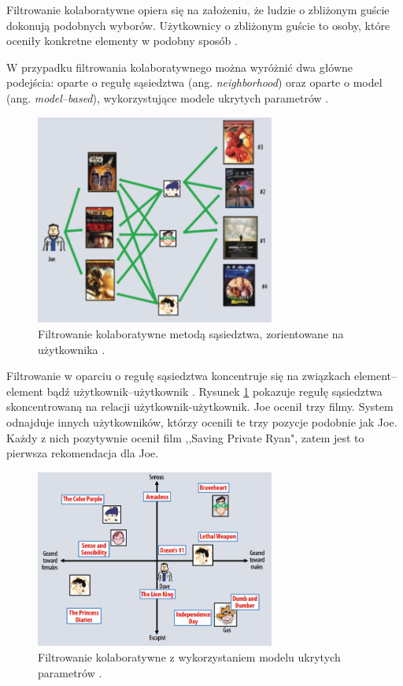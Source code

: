 \documentclass[twoside]{iisthesis}
\begin{document}
	  Filtrowanie kolaboratywne opiera się na założeniu, że ludzie o zbliżonym guście dokonują podobnych wyborów. Użytkownicy o zbliżonym guście to osoby, które oceniły konkretne elementy w podobny sposób \cite{id:IntroductionToRecommenderSystemsHandbook, id:CollaborativeFilteringRecommenderSystems, id:huynh2012modeling}. 
	  
	  W przypadku filtrowania kolaboratywnego można wyróżnić dwa główne podejścia: oparte o regułę sąsiedztwa (ang. \textit{neighborhood}) oraz oparte o model (ang. \textit{model--based}), wykorzystujące modele ukrytych parametrów \cite{id:AdvancesInCollaborativeFiltering,koren2009matrix}. 
	  
	  \begin{figure}[!ht] 
	  	\centering
	  	\includegraphics[width=0.7\textwidth]{cf}
	  	\caption{Filtrowanie kolaboratywne metodą sąsiedztwa,  zorientowane na użytkownika \protect\cite{koren2009matrix}.}
	  	\label{fig:cf}
	  \end{figure}
	  
	  Filtrowanie w oparciu o regułę sąsiedztwa koncentruje się na związkach element--element bądź użytkownik--użytkownik \cite{id:AdvancesInCollaborativeFiltering}.
	  Rysunek \ref{fig:cf} pokazuje regułę sąsiedztwa skoncentrowaną na relacji użytkownik-użytkownik. Joe ocenił trzy filmy. System odnajduje innych użytkowników, którzy ocenili te trzy pozycje podobnie jak Joe. Każdy z nich pozytywnie ocenił film ,,Saving Private Ryan", zatem jest to pierwsza rekomendacja dla Joe. 
	  
	  \begin{figure}[!ht] 
	  	\centering
	  	\includegraphics[width=0.7\textwidth]{cf2}
	  	\caption{Filtrowanie kolaboratywne z wykorzystaniem modelu ukrytych parametrów \protect\cite{koren2009matrix}.}
	  	\label{fig:cf2}
	  \end{figure}
	  
\end{document}
